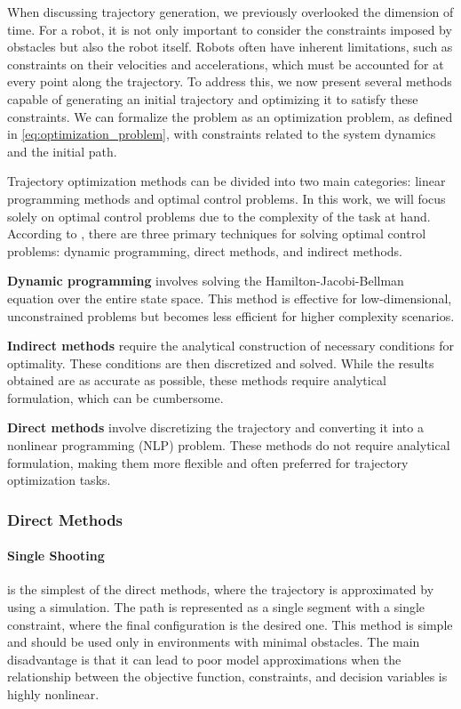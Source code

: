 When discussing trajectory generation, we previously overlooked the dimension of time. For a robot, it is not only important to consider the constraints imposed by obstacles but also the robot itself. Robots often have inherent limitations, such as constraints on their velocities and accelerations, which must be accounted for at every point along the trajectory. To address this, we now present several methods capable of generating an initial trajectory and optimizing it to satisfy these constraints. We can formalize the problem as an optimization problem, as defined in \ref{eq:optimization_problem}, with constraints related to the system dynamics and the initial path.

Trajectory optimization methods can be divided into two main categories: linear programming methods and optimal control problems. In this work, we will focus solely on optimal control problems due to the complexity of the task at hand. According to \cite{kelly2017introduction}, there are three primary techniques for solving optimal control problems: dynamic programming, direct methods, and indirect methods.

\textbf{Dynamic programming} involves solving the Hamilton-Jacobi-Bellman equation over the entire state space. This method is effective for low-dimensional, unconstrained problems but becomes less efficient for higher complexity scenarios.

\textbf{Indirect methods} require the analytical construction of necessary conditions for optimality. These conditions are then discretized and solved. While the results obtained are as accurate as possible, these methods require analytical formulation, which can be cumbersome.

\textbf{Direct methods} involve discretizing the trajectory and converting it into a nonlinear programming (NLP) problem. These methods do not require analytical formulation, making them more flexible and often preferred for trajectory optimization tasks.

\subsubsection{Direct Methods}
\paragraph{Single Shooting} is the simplest of the direct methods, where the trajectory is approximated by using a simulation. The path is represented as a single segment with a single constraint, where the final configuration is the desired one. This method is simple and should be used only in environments with minimal obstacles. The main disadvantage is that it can lead to poor model approximations when the relationship between the objective function, constraints, and decision variables is highly nonlinear.

